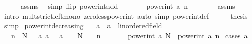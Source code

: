 \begin{isabellebody}
\ \ \ \ \isamarkupfalse%
\ assms\ \isamarkupfalse%
\ {\isacharparenleft}{\kern0pt}simp\ flip{\isacharcolon}{\kern0pt}\ power{\isacharunderscore}{\kern0pt}int{\isacharunderscore}{\kern0pt}add{\isacharparenright}{\kern0pt}\isanewline
\ \ \isamarkupfalse%
\ \isamarkupfalse%
\ {\isachardoublequoteopen}{\isasymdots}\ {\isacharless}{\kern0pt}\ power{\isacharunderscore}{\kern0pt}int\ a\ n\ {\isacharasterisk}{\kern0pt}\ {}{\isachardoublequoteclose}\isanewline
\ \ \ \ \isamarkupfalse%
\ assms\ {\isacharasterisk}{\kern0pt}\isanewline
\ \ \ \ \isamarkupfalse%
\ {\isacharparenleft}{\kern0pt}intro\ mult{\isacharunderscore}{\kern0pt}strict{\isacharunderscore}{\kern0pt}left{\isacharunderscore}{\kern0pt}mono\ zero{\isacharunderscore}{\kern0pt}less{\isacharunderscore}{\kern0pt}power{\isacharunderscore}{\kern0pt}int{\isacharparenright}{\kern0pt}\ {\isacharparenleft}{\kern0pt}auto\ simp{\isacharcolon}{\kern0pt}\ power{\isacharunderscore}{\kern0pt}int{\isacharunderscore}{\kern0pt}def{\isacharparenright}{\kern0pt}\isanewline
\ \ \isamarkupfalse%
\ \isamarkupfalse%
\ {\isacharquery}{\kern0pt}thesis\ \isamarkupfalse%
\ simp\isanewline
{}\isamarkupfalse%
%
\endisatagproof
{\isafoldproof}%
%
\isadelimproof
\isanewline
%
\endisadelimproof
\isanewline
{}\isamarkupfalse%
\ power{\isacharunderscore}{\kern0pt}int{\isacharunderscore}{\kern0pt}decreasing{\isacharcolon}{\kern0pt}\isanewline
\ \ \ a\ {\isacharcolon}{\kern0pt}{\isacharcolon}{\kern0pt}\ {\isachardoublequoteopen}{\isacharprime}{\kern0pt}a\ {\isacharcolon}{\kern0pt}{\isacharcolon}{\kern0pt}\ linordered{\isacharunderscore}{\kern0pt}field{\isachardoublequoteclose}\isanewline
\ \ \ {\isachardoublequoteopen}n\ {\isasymle}\ N{\isachardoublequoteclose}\ {\isachardoublequoteopen}{}\ {\isasymle}\ a{\isachardoublequoteclose}\ {\isachardoublequoteopen}a\ {\isasymle}\ {}{\isachardoublequoteclose}\ {\isachardoublequoteopen}a\ {\isasymnoteq}\ {}\ {\isasymor}\ N\ {\isasymnoteq}\ {}\ {\isasymor}\ n\ {\isacharequal}{\kern0pt}\ {}{\isachardoublequoteclose}\isanewline
\ \ \ \ \ {\isachardoublequoteopen}power{\isacharunderscore}{\kern0pt}int\ a\ N\ {\isasymle}\ power{\isacharunderscore}{\kern0pt}int\ a\ n{\isachardoublequoteclose}\isanewline
%
\isadelimproof
%
\endisadelimproof
%
\isatagproof
{}\isamarkupfalse%
\ {\isacharparenleft}{\kern0pt}cases\ {\isachardoublequoteopen}a\ {\isacharequal}{\kern0pt}\ {}{\isachardoublequoteclose}{\isacharparenright}{\kern0pt}\isanewline

\end{isabellebody}
